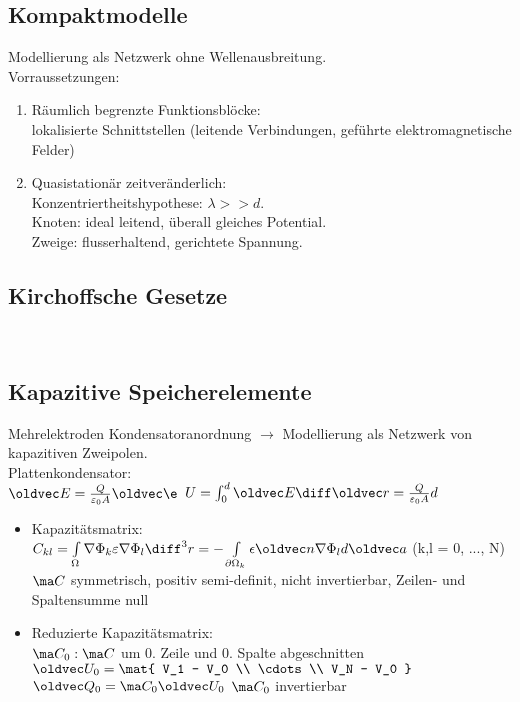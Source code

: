 \documentclass[6pt,a4paper]{scrartcl}
\let\vec\oldvec
\begin{document}
\begin{multicols}{4}
	\section{Kompaktmodelle}
	Modellierung als Netzwerk ohne Wellenausbreitung.\\
	Vorraussetzungen:\\
	\begin{enumerate}
		\item Räumlich begrenzte Funktionsblöcke:\\
			lokalisierte Schnittstellen (leitende Verbindungen, geführte elektromagnetische Felder)\\
		\item Quasistationär zeitveränderlich:\\
			Konzentriertheitshypothese: $\lambda >> d$.\\
			Knoten: ideal leitend, überall gleiches Potential.\\
			Zweige: flusserhaltend, gerichtete Spannung.\\
	\end{enumerate}
	
	
	
		\subsection{Kirchoffsche Gesetze}
		 \qquad {}\\
		
		\subsection{Kapazitive Speicherelemente}
		Mehrelektroden Kondensatoranordnung $\rightarrow$ Modellierung als Netzwerk von kapazitiven Zweipolen.\\
		Plattenkondensator: \\
		$\vec E = \frac{Q}{\varepsilon_0A}\vec\e$ \qquad $U = \int_0^d \vec E\diff\vec r = \frac{Q}{\varepsilon_0A}d$
		\begin{itemize}
			\item Kapazitätsmatrix:\\
				$C_{kl} = \int\limits_\Omega \nabla \Phi_k \varepsilon \nabla \Phi_l \diff^3 r = -\int\limits_{\partial\Omega_k} \epsilon \vec n \nabla \Phi_l d\vec a$ (k,l = 0, ..., N)\\
				$\ma C$ symmetrisch, positiv semi-definit, nicht invertierbar, Zeilen- und Spaltensumme null\\
			\item Reduzierte Kapazitätsmatrix:\\
				$\ma C_0: \ma C$ um 0. Zeile und 0. Spalte abgeschnitten\\
				$\vec U_0 = \mat{ V_1 - V_0 \\ \cdots \\ V_N - V_0 }$ \quad $\vec Q_0 = \ma C_0\vec U_0$ \quad $\ma C_0$ invertierbar\\
				

\end{itemize}
\end{multicols}
\end{document}
